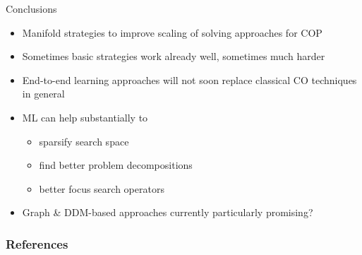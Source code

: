 \documentclass[aspectratio=1610]{beamer}
\begin{document}
\begin{frame}{Conclusions}
	\begin{itemize}
		\itemsep3ex
		\item Manifold strategies to improve scaling of solving approaches for COP
		\item Sometimes basic strategies work already well, sometimes much harder
		\item End-to-end learning approaches will not soon replace classical CO techniques in general
		\item ML can help substantially to
			\begin{itemize}
				\item sparsify search space
				\item find better problem decompositions
				\item better focus search operators 
			\end{itemize} 
		\item Graph \& DDM-based approaches currently particularly promising?
	\end{itemize}
\end{frame}




\begin{frame}[allowframebreaks]
	\frametitle{References}
	\small
	
\end{frame}
\end{document}
